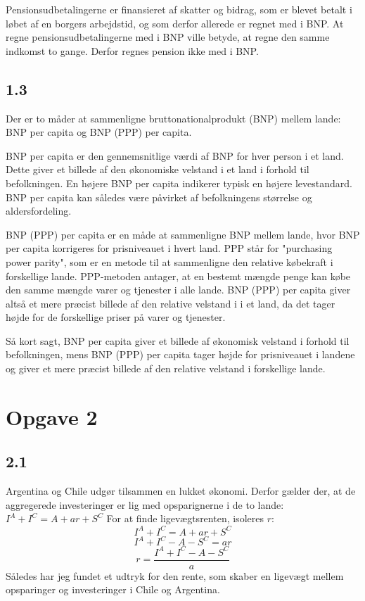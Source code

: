 \documentclass{article}
\begin{document}
Pensionsudbetalingerne er finansieret af skatter og bidrag, som er blevet betalt i løbet af en borgers arbejdstid, og som derfor allerede er regnet med i BNP. At regne pensionsudbetalingerne med i BNP ville betyde, at regne den samme indkomst to gange. Derfor regnes pension ikke med i BNP.

\subsection*{1.3}
Der er to måder at sammenligne bruttonationalprodukt (BNP) mellem lande: BNP per capita og BNP (PPP) per capita.

BNP per capita er den gennemsnitlige værdi af BNP for hver person i et land. Dette giver et billede af den økonomiske velstand i et land i forhold til befolkningen. En højere BNP per capita indikerer typisk en højere levestandard. BNP per capita kan således være påvirket af befolkningens størrelse og aldersfordeling.

BNP (PPP) per capita er en måde at sammenligne BNP mellem lande, hvor BNP per capita korrigeres for prisniveauet i hvert land. PPP står for "purchasing power parity", som er en metode til at sammenligne den relative købekraft i forskellige lande. PPP-metoden antager, at en bestemt mængde penge kan købe den samme mængde varer og tjenester i alle lande. BNP (PPP) per capita giver altså et mere præcist billede af den relative velstand i i et land, da det tager højde for de forskellige priser på varer og tjenester.

Så kort sagt, BNP per capita giver et billede af økonomisk velstand i forhold til befolkningen, mens BNP (PPP) per capita tager højde for prisniveauet i landene og giver et mere præcist billede af den relative velstand i forskellige lande.

\section*{Opgave 2}
\subsection*{2.1}
Argentina og Chile udgør tilsammen en lukket økonomi. Derfor gælder der, at de aggregerede investeringer er lig med opsparignerne i de to lande: $I^A+I^C=A+a r+S^C$
For at finde ligevægtsrenten, isoleres $r$:
\begin{equation}
    I^A+I^C=A+a r+S^C
\end{equation}
\begin{equation}
    I^A+I^C-A-S^C=a r
\end{equation}
\begin{equation}
    r=\frac{I^A+I^C-A-S^C}{a}
\end{equation}
Således har jeg fundet et udtryk for den rente, som skaber en ligevægt mellem opsparinger og investeringer i Chile og Argentina. 
\end{document}
